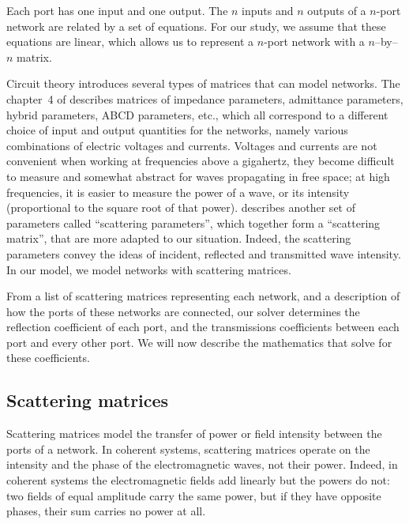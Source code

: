 \begin{refsection}
Each port has one input and one output.
The $n$ inputs and $n$ outputs of a $n$-port network are related by a set of equations.
For our study, we assume that these equations are linear,
which allows us to represent a $n$-port network with a $n$--by--$n$ matrix.

Circuit theory introduces several types of matrices that can model networks.
The chapter~4 of \textcite{pozar2009microwave} describes matrices of impedance parameters, admittance parameters, hybrid parameters, ABCD parameters, etc., which all correspond to a different choice of input and output quantities for the networks, namely various combinations of electric voltages and currents.
Voltages and currents are not convenient when working at frequencies above a gigahertz, they become difficult to measure and somewhat abstract for waves propagating in free space;
at high frequencies, it is easier to measure the power of a wave, or its intensity (proportional to the square root of that power).
\textcite{pozar2009microwave} describes another set of parameters called ``scattering parameters'', which together form a ``scattering matrix'', that are more adapted to our situation.
Indeed, the scattering parameters convey the ideas of incident, reflected and transmitted wave intensity.
In our model, we model networks with scattering matrices.

From a list of scattering matrices representing each network, and a description of how the ports of these networks are connected, our solver determines the reflection coefficient of each port, and the transmissions coefficients between each port and every other port.
We will now describe the mathematics that solve for these coefficients.






\subsection{Scattering matrices}

Scattering matrices \parencite{pozar2009microwave,siegman1986lasers} model the transfer of power or field intensity between the ports of a network.
In coherent systems, scattering matrices operate on the intensity and the phase of the electromagnetic waves, not their power.
Indeed, in coherent systems the electromagnetic fields add linearly but the powers do not: two fields of equal amplitude carry the same power, but if they have opposite phases, their sum carries no power at all.


\end{refsection}
